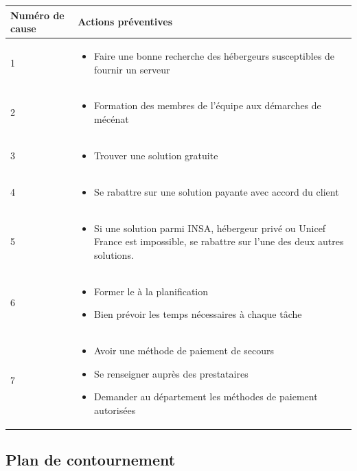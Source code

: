 \centering
	\begin{longtable}{|p{7cm}|p{7cm}|}
	\hline
	\rowcolor{gray!40} Numéro de cause & Actions préventives \\
	\hline
	1 & \begin{itemize}
		\item Faire une bonne recherche des hébergeurs susceptibles de fournir un serveur
		\end{itemize} \\
	\hline
	2 & \begin{itemize}
		\item Formation des membres de l'équipe aux démarches de mécénat
		\end{itemize} \\
	\hline
	3 & \begin{itemize}
		\item Trouver une solution gratuite
		\end{itemize} \\
	\hline
	4 & \begin{itemize}
		\item Se rabattre sur une solution payante avec accord du client
	\end{itemize} \\
	\hline
	5 & \begin{itemize}
		\item Si une solution parmi INSA, hébergeur privé ou Unicef France est impossible, se rabattre sur l'une des deux autres solutions.
	\end{itemize} \\
	\hline
	6 & \begin{itemize}
		\item Former le \CP{} à la planification
		\item Bien prévoir les temps nécessaires à chaque tâche
		\end{itemize} \\
	\hline
	7 & \begin{itemize}
		\item Avoir une méthode de paiement de secours
		\item Se renseigner auprès des prestataires
		\item Demander au département les méthodes de paiement autorisées
		\end{itemize} \\
	\hline
	\end{longtable}

\flushleft
\subsection*{Plan de contournement}

